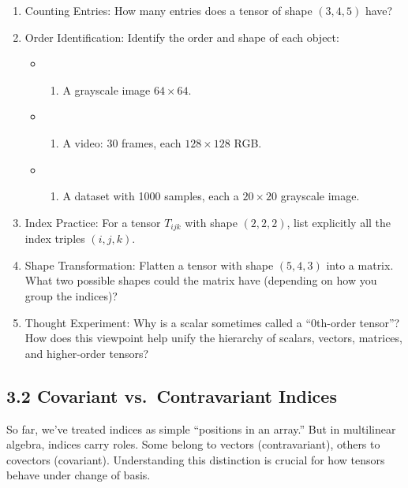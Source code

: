 \documentclass[
  letterpaper,
  DIV=11,
  numbers=noendperiod]{scrreprt}
\providecommand{\tightlist}{%
  \setlength{\itemsep}{0pt}\setlength{\parskip}{0pt}}
\begin{document}
\begin{enumerate}
\def\labelenumi{\arabic{enumi}.}
\item
  Counting Entries: How many entries does a tensor of shape \((3,4,5)\)
  have?
\item
  Order Identification: Identify the order and shape of each object:

  \begin{itemize}
  \tightlist
  \item
    \begin{enumerate}
    \def\labelenumii{(\alph{enumii})}
    \tightlist
    \item
      A grayscale image \(64 \times 64\).
    \end{enumerate}
  \item
    \begin{enumerate}
    \def\labelenumii{(\alph{enumii})}
    \setcounter{enumii}{1}
    \tightlist
    \item
      A video: 30 frames, each \(128 \times 128\) RGB.
    \end{enumerate}
  \item
    \begin{enumerate}
    \def\labelenumii{(\alph{enumii})}
    \setcounter{enumii}{2}
    \tightlist
    \item
      A dataset with 1000 samples, each a \(20 \times 20\) grayscale
      image.
    \end{enumerate}
  \end{itemize}
\item
  Index Practice: For a tensor \(T_{ijk}\) with shape \((2,2,2)\), list
  explicitly all the index triples \((i,j,k)\).
\item
  Shape Transformation: Flatten a tensor with shape \((5,4,3)\) into a
  matrix. What two possible shapes could the matrix have (depending on
  how you group the indices)?
\item
  Thought Experiment: Why is a scalar sometimes called a ``0th-order
  tensor''? How does this viewpoint help unify the hierarchy of scalars,
  vectors, matrices, and higher-order tensors?
\end{enumerate}

\subsection{3.2 Covariant vs.~Contravariant
Indices}\label{covariant-vs.-contravariant-indices}

So far, we've treated indices as simple ``positions in an array.'' But
in multilinear algebra, indices carry roles. Some belong to vectors
(contravariant), others to covectors (covariant). Understanding this
distinction is crucial for how tensors behave under change of basis.
\end{document}
